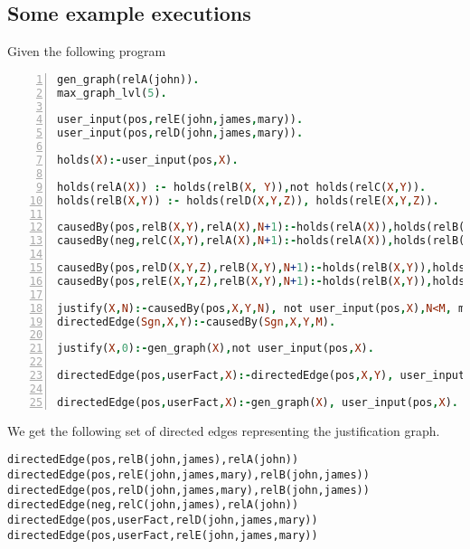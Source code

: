 \documentclass{article}
\begin{document}
\subsection{Some example executions}
Given the following program
\begin{lstlisting}[language=Prolog, numbers=left]
gen_graph(relA(john)).
max_graph_lvl(5).

user_input(pos,relE(john,james,mary)).
user_input(pos,relD(john,james,mary)). 

holds(X):-user_input(pos,X).

holds(relA(X)) :- holds(relB(X, Y)),not holds(relC(X,Y)).
holds(relB(X,Y)) :- holds(relD(X,Y,Z)), holds(relE(X,Y,Z)).

causedBy(pos,relB(X,Y),relA(X),N+1):-holds(relA(X)),holds(relB(X, Y)),not holds(relC(X,Y)),justify(relA(X),N).
causedBy(neg,relC(X,Y),relA(X),N+1):-holds(relA(X)),holds(relB(X, Y)),not holds(relC(X,Y)),justify(relA(X),N).

causedBy(pos,relD(X,Y,Z),relB(X,Y),N+1):-holds(relB(X,Y)),holds(relD(X,Y,Z)),holds(relE(X,Y,Z)),justify(relB(X,Y),N).
causedBy(pos,relE(X,Y,Z),relB(X,Y),N+1):-holds(relB(X,Y)),holds(relD(X,Y,Z)),holds(relE(X,Y,Z)),justify(relB(X,Y),N).

justify(X,N):-causedBy(pos,X,Y,N), not user_input(pos,X),N<M, max_graph_lvl(M).
directedEdge(Sgn,X,Y):-causedBy(Sgn,X,Y,M).

justify(X,0):-gen_graph(X),not user_input(pos,X).

directedEdge(pos,userFact,X):-directedEdge(pos,X,Y), user_input(pos,X).

directedEdge(pos,userFact,X):-gen_graph(X), user_input(pos,X).
\end{lstlisting}
We get the following set of directed edges representing the justification graph. 
\begin{verbatim}
directedEdge(pos,relB(john,james),relA(john))
directedEdge(pos,relE(john,james,mary),relB(john,james))
directedEdge(pos,relD(john,james,mary),relB(john,james))
directedEdge(neg,relC(john,james),relA(john))
directedEdge(pos,userFact,relD(john,james,mary))
directedEdge(pos,userFact,relE(john,james,mary))
\end{verbatim}
\end{document}
